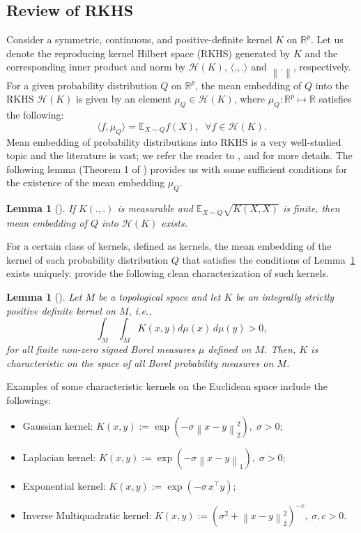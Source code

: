 \documentclass[11pt]{article}
\newcommand{\bE}{\mathbb{E}}
\theoremstyle{plain}
\newtheorem{lemma}[theorem]{Lemma}
\theoremstyle{definition}
\theoremstyle{remark}
\begin{document}
\subsection{Review of RKHS}\label{subsection:review_rkhs}
Consider a symmetric, continuous, and positive-definite kernel $K$ on $\mathbb{R}^p$. Let us denote the reproducing kernel Hilbert space (RKHS) generated by $K$ and the corresponding inner product and norm by $\mathcal{H}(K)$, $\langle .,.\rangle$ and $\left\|.\right\|$, respectively. For a given probability distribution $Q$ on $\mathbb{R}^p$, the mean embedding of $Q$ into the RKHS $\mathcal{H}(K)$ is given by an element $\mu_Q\in \mathcal{H}(K)$, where $\mu_Q :\mathbb{R}^p\mapsto \mathbb{R}$ satisfies the following:
\begin{equation}\label{eqn:mean_embedding}
    \langle f, \mu_Q\rangle=\bE_{X \sim Q} f(X),\;\;\forall f \in \mathcal{H}(K).
\end{equation}
Mean embedding of probability distributions into RKHS is a very well-studied topic and the literature is vast; we refer the reader to \cite{fukumizu2004dimensionality}, \cite{sriperumbudur2010hilbert} and \cite{berlinet2011reproducing} for more details. The following lemma (Theorem 1 of \cite{sriperumbudur2010hilbert}) provides us with some sufficient conditions for the existence of the mean embedding $\mu_Q$.
\begin{lemma}[\cite{JMLR:v13:gretton12a}]\label{lemma:existence_uniqueness_mean_embedding}
    If $K(.,.)$ is measurable and $\bE_{X \sim Q}\sqrt{K(X,X)}$ is finite, then mean embedding of $Q$ into $\mathcal{H}(K)$ exists.
\end{lemma}
For a certain class of kernels, defined as  kernels, the mean embedding of the kernel of each probability distribution $Q$ that satisfies the conditions of Lemma~\ref{lemma:existence_uniqueness_mean_embedding} exists uniquely. \cite{sriperumbudur2010hilbert} provide the following clean characterization of such kernels.
\begin{lemma}[\cite{sriperumbudur2010hilbert}]
    Let $M$ be a topological space and let $K$ be an integrally strictly positive definite kernel on $M$, i.e.,
    \[\int_M \,\int_M K(x,y)d\mu(x)\,d\mu(y)>0,\]
    for all finite non-zero signed Borel measures $\mu$ defined on $M$. Then, $K$ is characteristic on the space of all Borel probability measures on $M$.
\end{lemma}
Examples of some characteristic kernels on the Euclidean space include the followings:
\begin{itemize}
    \item Gaussian kernel: \(K(x,y):=\exp{\left(-\sigma \left\|x-y\right\|_2^2\right)},\;\sigma>0;\)
    \item Laplacian kernel: \(K(x,y):=\exp{\left(-\sigma \left\|x-y\right\|_1\right)},\;\sigma>0;\)
    \item Exponential kernel: \(K(x,y):=\exp{(-\sigma\,x^{\top}y)}\);
    \item Inverse Multiquadratic kernel: \(K(x,y):=(\sigma^2+\left\|x-y\right\|_2^2)^{-c},\;\sigma,c>0.\)
\end{itemize}
\end{document}
